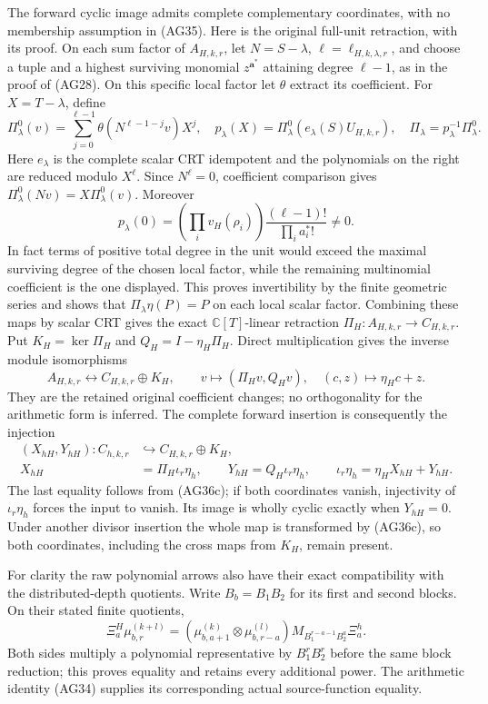 The forward cyclic image admits complete complementary coordinates,
with no membership assumption in (AG35).  Here is the original
full-unit retraction, with its proof.  On each sum factor of
$A_{H,k,r}$, let $N=S-\lambda$, $\ell=\ell_{H,k,\lambda,r}$,
and choose a tuple and a highest surviving monomial $z^{\mathbf a^*}$
attaining degree $\ell-1$, as in the proof of (AG28).  On this
specific local factor let $\theta$ extract its coefficient.  For
$X=T-\lambda$, define
\[
 \Pi_\lambda^0(v)=\sum_{j=0}^{\ell-1}
       \theta(N^{\ell-1-j}v)X^j,\quad
 p_\lambda(X)=\Pi_\lambda^0(e_\lambda(S)U_{H,k,r}),\quad
 \Pi_\lambda=p_\lambda^{-1}\Pi_\lambda^0.
 \tag{AG36b}
\]
Here $e_\lambda$ is the complete scalar CRT idempotent and the
polynomials on the right are reduced modulo $X^\ell$.
Since $N^\ell=0$, coefficient comparison gives
$\Pi_\lambda^0(Nv)=X\Pi_\lambda^0(v)$.  Moreover
\[
 p_\lambda(0)=\left(\prod_i v_H(\rho_i)\right)
                   \frac{(\ell-1)!}{\prod_i a_i^*!}\ne0.
\]
In fact terms of positive total degree in the unit would exceed
the maximal surviving degree of the chosen local factor, while
the remaining multinomial coefficient is the one displayed.
This proves invertibility by the finite geometric series and
shows that $\Pi_\lambda\eta(P)=P$ on each local scalar factor.
Combining these maps by scalar CRT gives the exact
$\mathbb C[T]$-linear retraction $\Pi_H:A_{H,k,r}\to C_{H,k,r}$.
Put $K_H=\ker\Pi_H$ and $Q_H=I-\eta_H\Pi_H$.  Direct multiplication
gives the inverse module isomorphisms
\[
 A_{H,k,r}\longleftrightarrow C_{H,k,r}\oplus K_H,
 \qquad v\longmapsto(\Pi_Hv,Q_Hv),\quad
 (c,z)\longmapsto\eta_Hc+z.
 \tag{AG36c}
\]
They are the retained original coefficient changes; no
orthogonality for the arithmetic form is inferred.
The complete forward insertion is consequently the injection
\[
 \begin{split}
 (X_{hH},Y_{hH}):C_{h,k,r}&\hookrightarrow C_{H,k,r}\oplus K_H,\\
 X_{hH}&=\Pi_H\iota_r\eta_h,\qquad
 Y_{hH}=Q_H\iota_r\eta_h,\qquad
 \iota_r\eta_h=\eta_HX_{hH}+Y_{hH}.
 \end{split}\tag{AG36d}
\]
The last equality follows from (AG36c); if both coordinates vanish,
injectivity of $\iota_r\eta_h$ forces the input to vanish.
Its image is wholly cyclic exactly when $Y_{hH}=0$.  Under another
divisor insertion the whole map is transformed by (AG36c), so both
coordinates, including the cross maps from $K_H$, remain present.

For clarity the raw polynomial arrows also have their exact
compatibility with the distributed-depth quotients.  Write
$B_b=B_1B_2$ for its first and second blocks.  On their stated
finite quotients,
\[
 \Xi_a^H\mu_{b,r}^{(k+l)}
 =(\mu_{b,a+1}^{(k)}\otimes\mu_{b,r-a}^{(l)})
    M_{B_1^{r-a-1}B_2^a}\Xi_a^h.
 \tag{AG36e}
\]
Both sides multiply a polynomial representative by
$B_1^rB_2^r$ before the same block reduction; this proves equality
and retains every additional power.  The arithmetic identity
(AG34) supplies its corresponding actual source-function equality.

